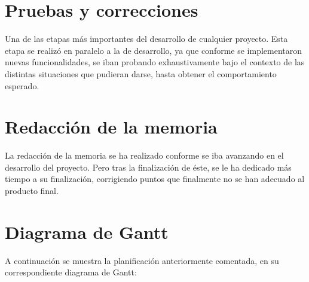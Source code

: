 \section{Pruebas y correcciones}

Una de las etapas más importantes del desarrollo de cualquier proyecto. Esta etapa se realizó en paralelo
a la de desarrollo, ya que conforme se implementaron nuevas funcionalidades, se iban probando exhaustivamente
bajo el contexto de las distintas situaciones que pudieran darse, hasta obtener el comportamiento
esperado.

\section{Redacción de la memoria}

La redacción de la memoria se ha realizado conforme se iba avanzando en el desarrollo del proyecto.
Pero tras la finalización de éste, se le ha dedicado más tiempo a su finalización, corrigiendo puntos que
finalmente no se han adecuado al producto final.

\section{Diagrama de Gantt}

A continuación se muestra la planificación anteriormente comentada, en su correspondiente diagrama de
Gantt:


